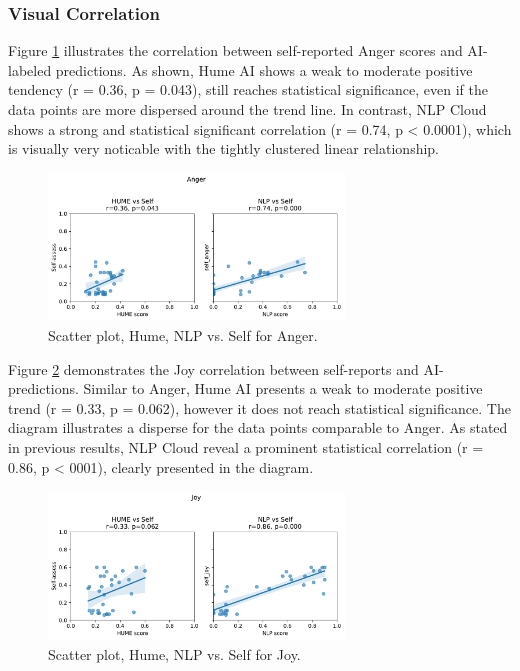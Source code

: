 \subsubsection{Visual Correlation}
Figure \ref{fig:scatter-anger-rq3} illustrates the correlation between self-reported Anger scores and AI-labeled predictions. As shown, Hume AI shows a weak to moderate positive tendency (r = 0.36, p = 0.043), still reaches statistical significance, even if the data points are more dispersed around the trend line. 
In contrast, NLP Cloud shows a strong and statistical significant correlation (r = 0.74, p < 0.0001), which is visually very noticable with the tightly clustered linear relationship. 

\begin{figure}[!h]
    \centering
    \includegraphics[width=0.7\textwidth]{png/results/rq3/scatter_anger_vs_self.pdf}
    \caption{Scatter plot, Hume, NLP vs. Self for Anger.}
    \label{fig:scatter-anger-rq3}
\end{figure}

Figure \ref{fig:scatter-joy-rq3} demonstrates the Joy correlation between self-reports and AI-predictions. Similar to Anger, Hume AI presents a weak to moderate positive trend (r = 0.33, p = 0.062), however it does not reach statistical significance. The diagram illustrates a disperse for the data points comparable to Anger.
As stated in previous results, NLP Cloud reveal a prominent statistical correlation (r = 0.86, p < 0001), clearly presented in the diagram. 
\begin{figure}[!h]
    \centering
    \includegraphics[width=0.7\textwidth]{png/results/rq3/scatter_joy_vs_self.pdf}
    \caption{Scatter plot, Hume, NLP vs. Self for Joy.}
    \label{fig:scatter-joy-rq3}
\end{figure}
\medskip

